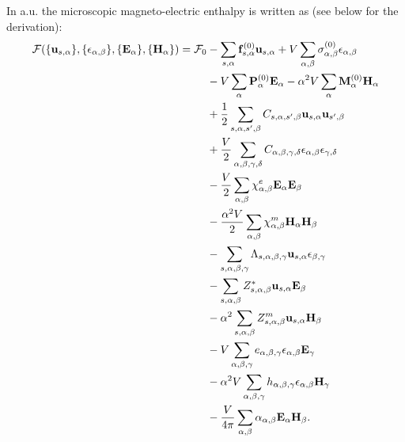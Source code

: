 \documentclass[12pt,a4paper,twoside]{report}
\begin{document}
\newpage
{\color{web-blue} In a.u. the microscopic magneto-electric enthalpy
is written as (see below for the derivation):
\begin{align}
\mathcal{F}(\{{\bf u}_{s,\alpha}\}, \{\epsilon_{\alpha,\beta}\},
\{ {\bf E}_\alpha\}, \{{\bf H}_\alpha\})=\mathcal{F}_0 &-
\sum_{s,\alpha} {\bf f}^{(0)}_{s,\alpha} {\bf u}_{s,\alpha}
+ V \sum_{\alpha,\beta}
\sigma_{\alpha,\beta}^{(0)} \epsilon_{\alpha,\beta} \nonumber \\ 
&- V \sum_{\alpha} {\bf P}^{(0)}_\alpha {\bf E}_\alpha - 
\alpha^2 V \sum_{\alpha}
{\bf M}^{(0)}_\alpha {\bf H}_\alpha \nonumber \\
&+ {1\over 2}
\sum_{s,\alpha,s',\beta} C_{s,\alpha,s',\beta} {\bf u}_{s,\alpha}
{\bf u}_{s',\beta}\nonumber \\
&+ {V\over 2}\sum_{\alpha,\beta,\gamma,\delta} 
C_{\alpha,\beta,\gamma,\delta}  
\epsilon_{\alpha,\beta}
\epsilon_{\gamma,\delta} \nonumber \\
&- {V\over 2} \sum_{\alpha,\beta} 
\chi^e_{\alpha,\beta}
{\bf E}_{\alpha}
{\bf E}_{\beta} \nonumber \\
&- {\alpha^2 V \over 2}  \sum_{\alpha,\beta} 
\chi^m_{\alpha,\beta}
{\bf H}_{\alpha}
{\bf H}_{\beta} \nonumber \\
&- \sum_{s,\alpha,\beta,\gamma}
\Lambda_{s,\alpha,\beta,\gamma} {\bf u}_{s,\alpha}
\epsilon_{\beta,\gamma}\nonumber \\
&- \sum_{s,\alpha,\beta} Z^*_{s,\alpha,\beta} 
{\bf u}_{s,\alpha} {\bf E}_{\beta} \nonumber \\
&- \alpha^2 \sum_{s,\alpha,\beta} 
Z^m_{s,\alpha,\beta} {\bf u}_{s,\alpha}{\bf H}_{\beta} \nonumber \\
&- V \sum_{\alpha,\beta,\gamma} e_{\alpha,\beta,\gamma} 
\epsilon_{\alpha,\beta} {\bf E}_{\gamma} \nonumber \\
&- \alpha^2 V \sum_{\alpha,\beta,\gamma}  h_{\alpha,\beta,\gamma} 
\epsilon_{\alpha,\beta} {\bf H}_{\gamma} \nonumber \\
&- {V \over 4 \pi} \sum_{\alpha,\beta} 
\alpha_{\alpha,\beta} {\bf E}_{\alpha}
{\bf H}_{\beta}.
\end{align}
}
\end{document}
